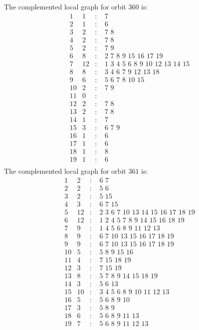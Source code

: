 \documentclass[12pt]{article}
\begin{document}
The complemented local graph for orbit $360$ is:
\begin{equation*}
\begin{array}{rrcl}
1&1&:&\,\,7\\
2&1&:&\,\,6\\
3&2&:&\,\,7\,\,8\\
4&2&:&\,\,7\,\,8\\
5&2&:&\,\,7\,\,9\\
6&8&:&\,\,2\,\,7\,\,8\,\,9\,\,15\,\,16\,\,17\,\,19\\
7&12&:&\,\,1\,\,3\,\,4\,\,5\,\,6\,\,8\,\,9\,\,10\,\,12\,\,13\,\,14\,\,15\\
8&8&:&\,\,3\,\,4\,\,6\,\,7\,\,9\,\,12\,\,13\,\,18\\
9&6&:&\,\,5\,\,6\,\,7\,\,8\,\,10\,\,15\\
10&2&:&\,\,7\,\,9\\
11&0&:&\\
12&2&:&\,\,7\,\,8\\
13&2&:&\,\,7\,\,8\\
14&1&:&\,\,7\\
15&3&:&\,\,6\,\,7\,\,9\\
16&1&:&\,\,6\\
17&1&:&\,\,6\\
18&1&:&\,\,8\\
19&1&:&\,\,6\\
\end{array}
\end{equation*}
The complemented local graph for orbit $361$ is:
\begin{equation*}
\begin{array}{rrcl}
1&2&:&\,\,6\,\,7\\
2&2&:&\,\,5\,\,6\\
3&2&:&\,\,5\,\,15\\
4&3&:&\,\,6\,\,7\,\,15\\
5&12&:&\,\,2\,\,3\,\,6\,\,7\,\,10\,\,13\,\,14\,\,15\,\,16\,\,17\,\,18\,\,19\\
6&12&:&\,\,1\,\,2\,\,4\,\,5\,\,7\,\,8\,\,9\,\,14\,\,15\,\,16\,\,18\,\,19\\
7&9&:&\,\,1\,\,4\,\,5\,\,6\,\,8\,\,9\,\,11\,\,12\,\,13\\
8&9&:&\,\,6\,\,7\,\,10\,\,13\,\,15\,\,16\,\,17\,\,18\,\,19\\
9&9&:&\,\,6\,\,7\,\,10\,\,13\,\,15\,\,16\,\,17\,\,18\,\,19\\
10&5&:&\,\,5\,\,8\,\,9\,\,15\,\,16\\
11&4&:&\,\,7\,\,15\,\,18\,\,19\\
12&3&:&\,\,7\,\,15\,\,19\\
13&8&:&\,\,5\,\,7\,\,8\,\,9\,\,14\,\,15\,\,18\,\,19\\
14&3&:&\,\,5\,\,6\,\,13\\
15&10&:&\,\,3\,\,4\,\,5\,\,6\,\,8\,\,9\,\,10\,\,11\,\,12\,\,13\\
16&5&:&\,\,5\,\,6\,\,8\,\,9\,\,10\\
17&3&:&\,\,5\,\,8\,\,9\\
18&6&:&\,\,5\,\,6\,\,8\,\,9\,\,11\,\,13\\
19&7&:&\,\,5\,\,6\,\,8\,\,9\,\,11\,\,12\,\,13\\
\end{array}
\end{equation*}
\end{document}
